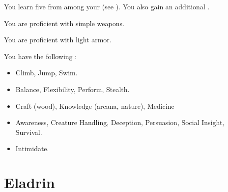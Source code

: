       You learn five  from among your  (see ). You also gain an additional .

      You are proficient with simple weapons.

      You are proficient with light armor.

      You have the following :
      \begin{itemize}
        \item {} Climb, Jump, Swim.
        \item {} Balance, Flexibility, Perform, Stealth.
        \item {} Craft (wood), Knowledge (arcana, nature), Medicine
        \item {} Awareness, Creature Handling, Deception, Persuasion, Social Insight, Survival.
        \item {} Intimidate.
      \end{itemize}

\section{Eladrin}

